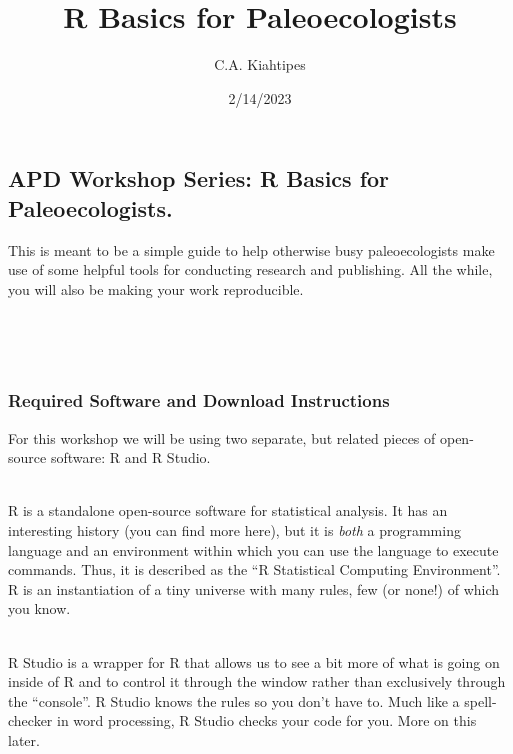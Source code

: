 \documentclass[
]{article}
\title{R Basics for Paleoecologists}
\author{C.A. Kiahtipes}
\date{2/14/2023}
\begin{document}
\maketitle

\hypertarget{apd-workshop-series-r-basics-for-paleoecologists.}{%
\subsection{APD Workshop Series: R Basics for
Paleoecologists.}\label{apd-workshop-series-r-basics-for-paleoecologists.}}

\hfill\break

This is meant to be a simple guide to help otherwise busy
paleoecologists make use of some helpful tools for conducting research
and publishing. All the while, you will also be making your work
reproducible.\\
\strut \\
\strut \\

\hypertarget{required-software-and-download-instructions}{%
\subsubsection{Required Software and Download
Instructions}\label{required-software-and-download-instructions}}

\hfill\break

For this workshop we will be using two separate, but related pieces of
open-source software: R and R Studio.\\
\strut \\
R is a standalone open-source software for statistical analysis. It has
an interesting history (you can find more here), but it is \emph{both} a
programming language and an environment within which you can use the
language to execute commands. Thus, it is described as the ``R
Statistical Computing Environment''. R is an instantiation of a tiny
universe with many rules, few (or none!) of which you know.\\
\strut \\
R Studio is a wrapper for R that allows us to see a bit more of what is
going on inside of R and to control it through the window rather than
exclusively through the ``console''. R Studio knows the rules so you
don't have to. Much like a spell-checker in word processing, R Studio
checks your code for you. More on this later.\\
\strut \\
\strut \\
\end{document}
